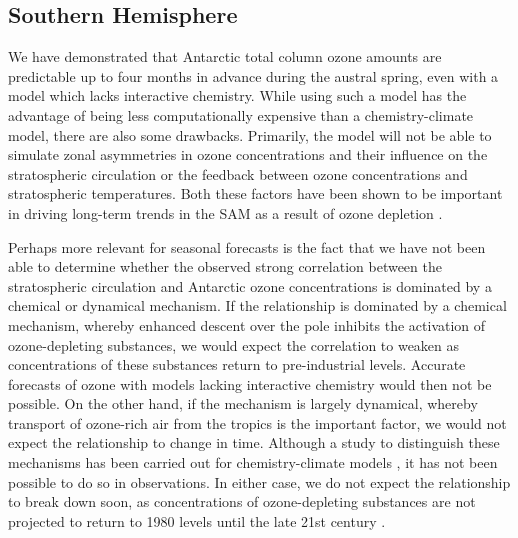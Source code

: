 \subsection{Southern Hemisphere}
We have demonstrated that Antarctic total column ozone amounts are predictable
up to four months in advance during the austral spring, even with a model which
lacks interactive chemistry. While using such a model has the advantage of being
less computationally expensive than a chemistry-climate model, there are also
some drawbacks. Primarily, the model will not be able to simulate zonal
asymmetries in ozone concentrations and their influence on the stratospheric
circulation or the feedback between ozone concentrations and stratospheric
temperatures. Both these factors have been shown to be important in driving
long-term trends in the SAM as a result of ozone depletion \citep{Thompson2002a,
  Crook2008, Waugh2009}.

Perhaps more relevant for seasonal forecasts is the fact that we have not been
able to determine whether the observed strong correlation between the
stratospheric circulation and Antarctic ozone concentrations is dominated by a
chemical or dynamical mechanism. If the relationship is dominated by a chemical
mechanism, whereby enhanced descent over the pole inhibits the activation of
ozone-depleting substances, we would expect the correlation to weaken as
concentrations of these substances return to pre-industrial levels. Accurate
forecasts of ozone with models lacking interactive chemistry would then not be
possible. On the other hand, if the mechanism is largely dynamical, whereby
transport of ozone-rich air from the tropics is the important factor, we would
not expect the relationship to change in time.  Although a study to distinguish
these mechanisms has been carried out for chemistry-climate models
\citep{Garny2011}, it has not been possible to do so in observations. In either
case, we do not expect the relationship to break down soon, as concentrations of
ozone-depleting substances are not projected to return to 1980 levels until the
late 21st century \citep{WMO2010}.

